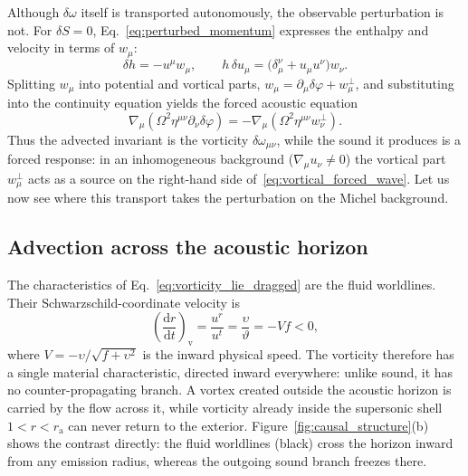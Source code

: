 \documentclass[12pt,a4paper,preprint,nopreprintline]{elsarticle}
\begin{document}
Although $\delta\omega$ itself is transported autonomously, the observable perturbation is not. For $\delta S=0$, Eq.~\eqref{eq:perturbed_momentum} expresses the enthalpy and velocity in terms of $w_{\mu}$:
\begin{equation}
    \delta h
    =
    -u^{\mu}w_{\mu},
    \qquad
    h\,\delta u_{\mu}
    =
    \bigl(\delta_{\mu}^{\nu}+u_{\mu}u^{\nu}\bigr)w_{\nu}.
    \label{eq:vortical_enthalpy_velocity}
\end{equation}
Splitting $w_{\mu}$ into potential and vortical parts, $w_{\mu}=\partial_{\mu}\delta\varphi+w_{\mu}^{\perp}$, and substituting into the continuity equation yields the forced acoustic equation
\begin{equation}
    \nabla_{\mu}
    \left(
        \Omega^{2}\eta^{\mu\nu}
        \partial_{\nu}\delta\varphi
    \right)
    =
    -
    \nabla_{\mu}
    \left(
        \Omega^{2}\eta^{\mu\nu}w_{\nu}^{\perp}
    \right).
    \label{eq:vortical_forced_wave}
\end{equation}
Thus the advected invariant is the vorticity $\delta\omega_{\mu\nu}$, while the sound it produces is a forced response: in an inhomogeneous background ($\nabla_{\mu}u_{\nu}\neq0$) the vortical part $w_{\mu}^{\perp}$ acts as a source on the right-hand side of~\eqref{eq:vortical_forced_wave}. Let us now see where this transport takes the perturbation on the Michel background.

\subsection{Advection across the acoustic horizon}
\label{sec:vortical_transport}

The characteristics of Eq.~\eqref{eq:vorticity_lie_dragged} are the fluid worldlines. Their Schwarzschild-coordinate velocity is
\begin{equation}
    \left(\frac{\mathrm{d}r}{\mathrm{d}t}\right)_{\mathrm{v}}
    =
    \frac{u^{r}}{u^{t}}
    =
    \frac{\upsilon}{\vartheta}
    =
    -Vf<0,
    \label{eq:vortex_characteristic}
\end{equation}
where $V=-\upsilon/\sqrt{f+\upsilon^{2}}$ is the inward physical speed. The vorticity therefore has a single material characteristic, directed inward everywhere: unlike sound, it has no counter-propagating branch. A vortex created outside the acoustic horizon is carried by the flow across it, while vorticity already inside the supersonic shell $1<r<r_{\mathrm{a}}$ can never return to the exterior. Figure~\ref{fig:causal_structure}(b) shows the contrast directly: the fluid worldlines (black) cross the horizon inward from any emission radius, whereas the outgoing sound branch freezes there.
\end{document}

